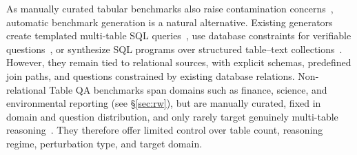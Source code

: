 As manually curated tabular benchmarks also raise contamination concerns~\cite{datacontamination}, automatic benchmark generation is a natural alternative. Existing generators create templated multi-table SQL queries~\cite{PapicchioPC23}, use database constraints for verifiable questions~\cite{5.5}, or synthesize SQL programs over structured table--text collections~\cite{5.8}. However, they remain tied to relational sources, with explicit schemas, predefined join paths, and questions constrained by existing database relations. Non-relational Table QA benchmarks span domains such as finance, science, and environmental reporting (see \S\ref{sec:rw}), but are manually curated, fixed in domain and question distribution, and only rarely target genuinely multi-table reasoning~\cite{1.26,1.16}. They therefore offer limited control over table count, reasoning regime, perturbation type, and target domain.




